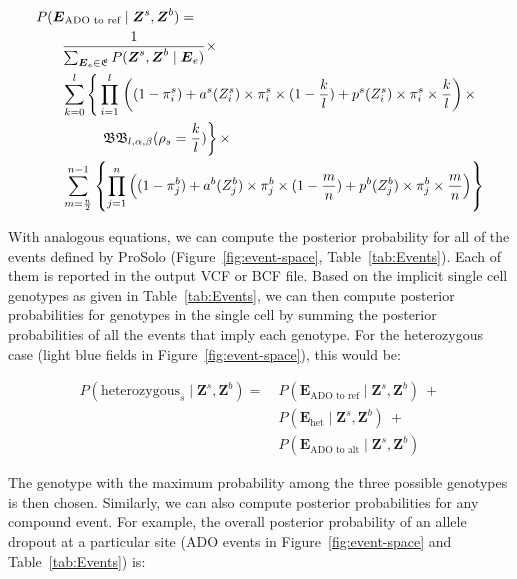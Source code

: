 \documentclass[authoryear,preprint,11pt]{scrartcl}
\newcommand{\Prob}{{P}}
\newcommand{\cB}{{\mathfrak B}}
\begin{document}
\begin{equation}
  \begin{split}
  \label{eq:ado-to-ref-posterior-prob}
    \Prob(&\boldsymbol{E}_{\text{ADO to ref}} \mid \boldsymbol{Z}^s,\boldsymbol{Z}^b) =\\
    &~~\frac{1}{\sum_{\boldsymbol{E}_e \in \mathfrak{E}}{\Prob(\boldsymbol{Z}^s,\boldsymbol{Z}^b \mid \boldsymbol{E}_e )}} \times\\
    &~~\sum_{k=0}^{l} \left\{\vphantom{\prod_{i}{l}} \prod_{i=1}^{l} \right.\left( (1 - \pi_i^s) + a^s(Z_i^s)\times \pi_i^s \times (1 - \frac{k}{l}) + p^s(Z_i^s) \times \pi_i^s \times \frac{k}{l} \right) \times \\
    &~~\qquad~~\left.\cB\cB_{l,\alpha, \beta} (\rho_s = \frac{k}{l}) \right\} \times\\
    &~~\sum_{m=\frac{n}{2}}^{n-1} \left\{ \prod_{j=1}^{n} \left( (1 - \pi_j^b) + a^b(Z_j^b)\times \pi_j^b \times (1 - \frac{m}{n}) + p^b(Z_j^b) \times \pi_j^b \times \frac{m}{n} \right) \right\}\\
  \end{split}
\end{equation}


With analogous equations, we can compute the posterior probability for all of the events defined by ProSolo (Figure~\ref{fig:event-space}, Table~\ref{tab:Events}).
Each of them is reported in the output VCF or BCF file.
Based on the implicit single cell genotypes as given in Table~\ref{tab:Events}, we can then compute posterior probabilities for genotypes in the single cell by summing the posterior probabilities of all the events that imply each genotype.
For the heterozygous case (light blue fields in Figure~\ref{fig:event-space}), this would be:

\begin{equation}
 \label{eq:het-posterior-prob}
 \begin{split}
  \Prob(\text{heterozygous}_s \mid \boldsymbol{Z}^s,\boldsymbol{Z}^b) =~&
    \Prob(\boldsymbol{E}_{\text{ADO to ref}} \mid \boldsymbol{Z}^s,\boldsymbol{Z}^b)~+ \\
  &\Prob(\boldsymbol{E}_{\text{het}} \mid \boldsymbol{Z}^s,\boldsymbol{Z}^b)~+ \\
  &\Prob(\boldsymbol{E}_{\text{ADO to alt}} \mid \boldsymbol{Z}^s,\boldsymbol{Z}^b)
 \end{split}
\end{equation}

The genotype with the maximum probability among the three possible genotypes is then chosen.
Similarly, we can also compute posterior probabilities for any compound event.
For example, the overall posterior probability of an allele dropout at a particular site ({\ttfamily ADO} events in Figure~\ref{fig:event-space} and Table~\ref{tab:Events}) is:
\end{document}
